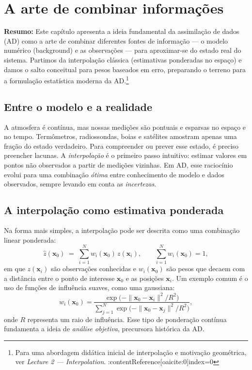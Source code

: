 \chapter{A arte de combinar informações}
\label{ch:arte-combinar}

\noindent\textbf{Resumo:}
Este capítulo apresenta a ideia fundamental da assimilação de dados (AD) como a arte de combinar diferentes fontes de informação --- o modelo numérico (background) e as observações --- para aproximar-se do estado real do sistema. Partimos da interpolação clássica (estimativas ponderadas no espaço) e damos o salto conceitual para pesos baseados em erro, preparando o terreno para a formulação estatística moderna da AD.\footnote{Para uma abordagem didática inicial de interpolação e motivação geométrica, ver \emph{Lecture 2 --- Interpolation}. :contentReference[oaicite:0]{index=0}}

\section{Entre o modelo e a realidade}
A atmosfera é contínua, mas nossas medições são pontuais e esparsas no espaço e no tempo. Termômetros, radiossondas, boias e satélites amostram apenas uma fração do estado verdadeiro. Para compreender ou prever esse estado, é preciso preencher lacunas. A \emph{interpolação} é o primeiro passo intuitivo: estimar valores em pontos não observados a partir de medições vizinhas. Em AD, esse raciocínio evolui para uma combinação \emph{ótima} entre conhecimento de modelo e dados observados, sempre levando em conta as \emph{incertezas}.

\section{A interpolação como estimativa ponderada}
Na forma mais simples, a interpolação pode ser descrita como uma combinação linear ponderada:
\begin{equation}
\hat{z}(\mathbf{x}_0) \;=\; \sum_{i=1}^{N} w_i(\mathbf{x}_0)\, z(\mathbf{x}_i),
\qquad
\sum_{i=1}^{N} w_i(\mathbf{x}_0) = 1,
\label{eq:interp-linear}
\end{equation}
em que $z(\mathbf{x}_i)$ são observações conhecidas e $w_i(\mathbf{x}_0)$ são pesos que decaem com a distância entre o ponto de interesse $\mathbf{x}_0$ e as posições $\mathbf{x}_i$. Um exemplo comum é o uso de funções de influência suaves, como uma gaussiana:
\begin{equation}
w_i(\mathbf{x}_0) = \frac{\exp\!\big(-\|\mathbf{x}_0-\mathbf{x}_i\|^2/R^2\big)}{\sum_{j=1}^{N} \exp\!\big(-\|\mathbf{x}_0-\mathbf{x}_j\|^2/R^2\big)},
\label{eq:pesos-gauss}
\end{equation}
onde $R$ representa um raio de influência. Esse tipo de ponderação contínua fundamenta a ideia de \emph{análise objetiva}, precursora histórica da AD.

